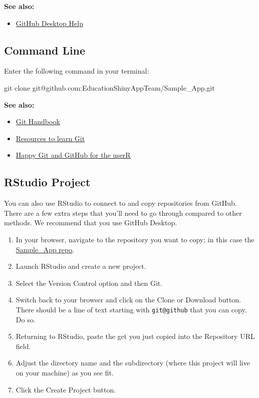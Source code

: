 \documentclass[
]{book}
\newenvironment{Shaded}{\begin{snugshade}}{\end{snugshade}}
\newcommand{\FunctionTok}[1]{\textcolor[rgb]{0.00,0.00,0.00}{#1}}
\newcommand{\NormalTok}[1]{#1}
\providecommand{\tightlist}{%
  \setlength{\itemsep}{0pt}\setlength{\parskip}{0pt}}
\begin{document}
\textbf{See also:}

\begin{itemize}
\tightlist
\item
  \href{https://help.github.com/en/desktop}{GitHub Desktop Help}
\end{itemize}

\hypertarget{command-line}{%
\subsection{Command Line}\label{command-line}}

Enter the following command in your terminal:

\begin{Shaded}
\begin{Highlighting}[]
\FunctionTok{git}\NormalTok{ clone git@github.com:EducationShinyAppTeam/Sample_App.git}
\end{Highlighting}
\end{Shaded}

\textbf{See also:}

\begin{itemize}
\tightlist
\item
  \href{https://guides.github.com/introduction/git-handbook/}{Git Handbook}
\item
  \href{https://try.github.io/}{Resources to learn Git}
\item
  \href{https://happygitwithr.com/}{Happy Git and GitHub for the userR}
\end{itemize}

\hypertarget{rstudio-project}{%
\subsection{RStudio Project}\label{rstudio-project}}

You can also use RStudio to connect to and copy repositories from GitHub. There are a few extra steps that you'll need to go through compared to other methods. We recommend that you use GitHub Desktop.

\begin{enumerate}
\def\labelenumi{\arabic{enumi}.}
\tightlist
\item
  In your browser, navigate to the repository you want to copy; in this case the \href{https://github.com/EducationShinyAppTeam/Sample_App}{Sample\_App repo}.
\item
  Launch RStudio and create a new project.
\item
  Select the Version Control option and then Git.
\item
  Switch back to your browser and click on the Clone or Download button. There should be a line of text starting with \texttt{git@github} that you can copy. Do so.
\item
  Returning to RStudio, paste the get you just copied into the Repository URL field.
\item
  Adjust the directory name and the subdirectory (where this project will live on your machine) as you see fit.
\item
  Click the Create Project button.
\end{enumerate}
\end{document}
